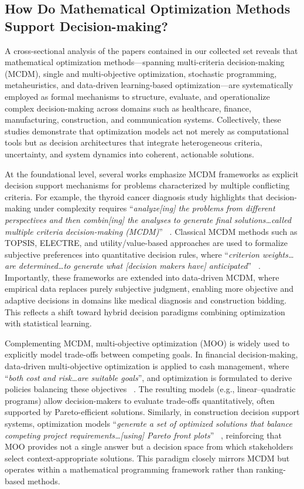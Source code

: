 \documentclass{sfuthesis}
\begin{document}
\subsection{How Do Mathematical Optimization Methods Support Decision-making?}
A cross-sectional analysis of the papers contained in our collected set reveals that mathematical optimization methods—spanning multi-criteria decision-making (MCDM), single and multi-objective optimization, stochastic programming, metaheuristics, and data-driven learning-based optimization—are systematically employed as formal mechanisms to structure, evaluate, and operationalize complex decision-making across domains such as healthcare, finance, manufacturing, construction, and communication systems. Collectively, these studies demonstrate that optimization models act not merely as computational tools but as decision architectures that integrate heterogeneous criteria, uncertainty, and system dynamics into coherent, actionable solutions.\par
At the foundational level, several works emphasize MCDM frameworks as explicit decision support mechanisms for problems characterized by multiple conflicting criteria. For example, the thyroid cancer diagnosis study highlights that decision-making under complexity requires “\textit{analyze[ing] the problems from different perspectives and then combin[ing] the analyses to generate final solutions…called multiple criteria decision-making (MCDM)}” ~\cite{fu2020data}. Classical MCDM methods such as TOPSIS, ELECTRE, and utility/value-based approaches are used to formalize subjective preferences into quantitative decision rules, where “\textit{criterion weights…are determined…to generate what [decision makers have] anticipated}” ~\cite{fu2020data}. Importantly, these frameworks are extended into data-driven MCDM, where empirical data replaces purely subjective judgment, enabling more objective and adaptive decisions in domains like medical diagnosis and construction bidding. This reflects a shift toward hybrid decision paradigms combining optimization with statistical learning.\par
Complementing MCDM, multi-objective optimization (MOO) is widely used to explicitly model trade-offs between competing goals. In financial decision-making, data-driven multi-objective optimization is applied to cash management, where “\textit{both cost and risk…are suitable goals}”, and optimization is formulated to derive policies balancing these objectives ~\cite{SalasMolina2018CashManagement}. The resulting models (e.g., linear–quadratic programs) allow decision-makers to evaluate trade-offs quantitatively, often supported by Pareto-efficient solutions. Similarly, in construction decision support systems, optimization models “\textit{generate a set of optimized solutions that balance competing project requirements…[using] Pareto front plots}” ~\cite{Sheikhkhoshkar2025ConstructionDSS}, reinforcing that MOO provides not a single answer but a decision space from which stakeholders select context-appropriate solutions. This paradigm closely mirrors MCDM but operates within a mathematical programming framework rather than ranking-based methods.\par
\end{document}
